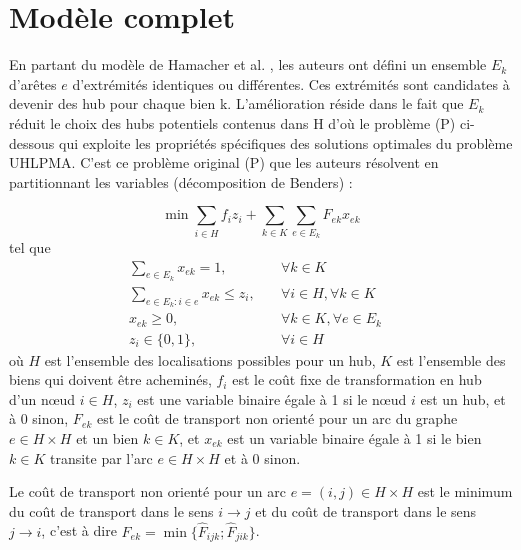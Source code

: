 \section{Modèle complet}

En partant du modèle de Hamacher et al. \cite[Adapting polyhedral properties from facility to hub location problems (2004)]{hln}, les auteurs ont défini un ensemble $E_k$ d'arêtes $e$ d'extrémités identiques ou différentes. Ces extrémités sont candidates à devenir des hub pour chaque bien k. L'amélioration réside dans le fait que $E_k$ réduit le choix des hubs potentiels contenus dans H d'où le problème (P) ci-dessous qui exploite les propriétés spécifiques des solutions optimales du problème UHLPMA. C'est ce problème original (P) que les auteurs résolvent en partitionnant les variables (décomposition de Benders) : 

\[ \min \sum_{i \in H}f_iz_i + \sum_{k \in K}\sum_{e \in E_k}F_{ek}x_{ek}\]
tel que
\begin{subequations}
    \begin{align}
        \sum_{e \in E_k}x_{ek} = 1, \quad &\forall{k\in K}&\\
        \sum_{e \in E_k:i\in e}x_{ek} \le z_i,\quad &\forall{i \in H}, \forall{k\in K}&\\
        x_{ek} \ge 0, \quad &\forall{k \in K}, \forall{e \in E_k}&\\
        z_i\in \{0,1\},\quad &\forall{ i \in H}&
    \end{align}
\end{subequations}
 où $H$ est l'ensemble des localisations possibles pour un hub, $K$ est l'ensemble des biens qui doivent être acheminés, $f_i$ est le coût fixe de transformation en hub d'un n\oe ud $i\in H$, $z_i$ est une variable binaire égale à 1 si le n\oe ud $i$ est un hub, et à 0 sinon, $F_{ek}$ est le coût de transport non orienté pour un arc du graphe $e \in H\times H$ et un bien $k \in K$, et $x_{ek}$ est un variable binaire égale à 1 si le bien $k \in K$ transite par l'arc $e \in H\times H$ et à 0 sinon.
 
 Le coût de transport non orienté pour un arc $e = (i,j) \in H\times H$ est le minimum du coût de transport dans le sens $i \rightarrow j$ et du coût de transport dans le sens $j \rightarrow i$, c'est à dire $F_{ek} = \min \{ \hat{F}_{ijk};\hat{F}_{jik}\}$.


